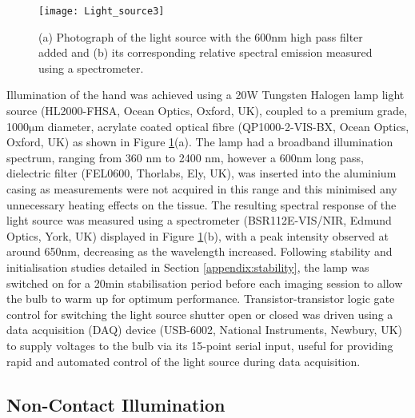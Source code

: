 \documentclass[twoside]{bhamthesis}
\theoremstyle{definition}
\begin{document}
\begin{figure}[!ht]
\centering
  \texttt{[image: Light\_source3]}
\caption{(a) Photograph of the light source with the 600nm high pass filter added and (b) its corresponding relative spectral emission measured using a spectrometer.}
  \label{fig:Light_source3}
\end{figure}

Illumination of the hand was achieved using a 20W Tungsten Halogen lamp light source (HL2000-FHSA, Ocean Optics, Oxford, UK), coupled to a premium grade, 1000$\mathrm{\mu}$m diameter, acrylate coated optical fibre (QP1000-2-VIS-BX,  Ocean Optics, Oxford, UK) as shown in Figure \ref{fig:Light_source3}(a). The lamp had a broadband illumination spectrum, ranging from 360 nm to 2400 nm, however a 600nm long pass, dielectric filter (FEL0600, Thorlabs, Ely, UK), was inserted into the aluminium casing as measurements were not acquired in this range and this minimised any unnecessary heating effects on the tissue. The resulting spectral response of the light source was measured using a spectrometer (BSR112E-VIS/NIR, Edmund Optics, York, UK) displayed in Figure \ref{fig:Light_source3}(b), with a peak intensity observed at around 650nm, decreasing as the wavelength increased. Following stability and initialisation studies detailed in Section \ref{appendix:stability}, the lamp was switched on for a 20min stabilisation period before each imaging session to allow the bulb to warm up for optimum performance. Transistor-transistor logic gate control for switching the light source shutter open or closed was driven using a data acquisition (DAQ) device (USB-6002, National Instruments, Newbury, UK) to supply voltages to the bulb via its 15-point serial input, useful for providing rapid and automated control of the light source during data acquisition.

\subsection{Non-Contact Illumination}
\end{document}
